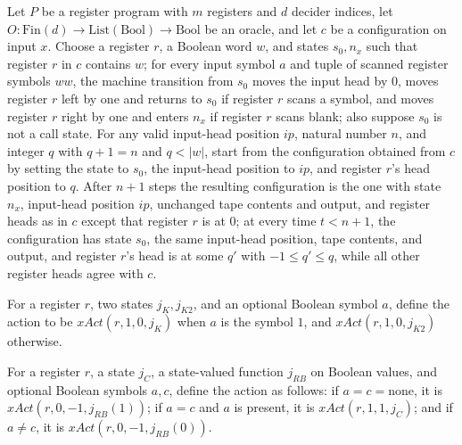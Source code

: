 \begin{lemma}
\label{Complexity.LogProg.regBack_x}
\leanok
{}
Let $P$ be a register program with $m$ registers and $d$ decider indices, let
$O:\mathrm{Fin}(d)\to\mathrm{List}(\mathrm{Bool})\to\mathrm{Bool}$ be an oracle, and let $c$ be a
configuration on input $x$. Choose a register $r$, a Boolean word $w$, and states
$s_0,n_x$ such that register $r$ in $c$ contains $w$; for every input symbol $a$ and
tuple of scanned register symbols $ww$, the machine transition from $s_0$ moves the
input head by $0$, moves register $r$ left by one and returns to $s_0$ if register $r$
scans a symbol, and moves register $r$ right by one and enters $n_x$ if register $r$
scans blank; also suppose $s_0$ is not a call state. For any valid input-head position
$ip$, natural number $n$, and integer $q$ with $q+1=n$ and $q<|w|$, start from the
configuration obtained from $c$ by setting the state to $s_0$, the input-head position
to $ip$, and register $r$'s head position to $q$. After $n+1$ steps the resulting
configuration is the one with state $n_x$, input-head position $ip$, unchanged tape
contents and output, and register heads as in $c$ except that register $r$ is at $0$; at
every time $t<n+1$, the configuration has state $s_0$, the same input-head position,
tape contents, and output, and register $r$'s head is at some $q'$ with $-1\le q'\le q$,
while all other register heads agree with $c$.
\end{lemma}

\begin{definition}
\label{Complexity.LogProg.skipAct}
\leanok
{}
For a register $r$, two states $j_K,j_{K2}$, and an optional Boolean symbol $a$, define
the action to be $xAct(r,1,0,j_K)$ when $a$ is the symbol $1$, and $xAct(r,1,0,j_{K2})$
otherwise.
\end{definition}

\begin{definition}
\label{Complexity.LogProg.cmpAct}
\leanok
{}
For a register $r$, a state $j_C$, a state-valued function $j_{RB}$ on Boolean values,
and optional Boolean symbols $a,c$, define the action as follows: if
$a=c=\mathrm{none}$, it is $xAct(r,0,-1,j_{RB}(1))$; if $a=c$ and $a$ is present, it is
$xAct(r,1,1,j_C)$; and if $a\ne c$, it is $xAct(r,0,-1,j_{RB}(0))$.
\end{definition}

